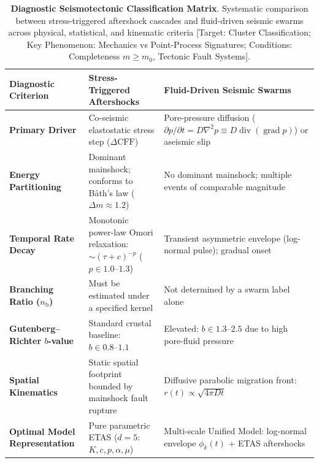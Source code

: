 \begin{table}[htbp]
  \centering
  \small
  \begin{threeparttable}
    \caption{\textbf{Diagnostic Seismotectonic Classification
      Matrix}. Systematic comparison between stress-triggered
      aftershock cascades and fluid-driven seismic swarms across
      physical, statistical, and kinematic criteria [Target: Cluster
        Classification; Key Phenomenon: Mechanics vs Point-Process
    Signatures; Conditions: Completeness $m \ge m_0$, Tectonic Fault Systems].}
    \label{tab:clustering_aftershock_vs_swarm}
    \begin{tabularx}{\textwidth}{l >{\raggedright\arraybackslash}X
      >{\raggedright\arraybackslash}X}
      \toprule
      \textbf{Diagnostic Criterion} & \textbf{Stress-Triggered
      Aftershocks} & \textbf{Fluid-Driven Seismic Swarms} \\
      \midrule
      \textbf{Primary Driver} & Co-seismic elastostatic stress step
      ($\Delta\mathrm{CFF}$) & Pore-pressure diffusion ($\partial p
        / \partial t = D \nabla^2 p \equiv D
      \operatorname{div}(\operatorname{grad} p)$) or aseismic slip \\
      \textbf{Energy Partitioning} & Dominant mainshock; conforms to
      B\r{a}th's law ($\Delta m \approx \num{1.2}$) & No dominant
      mainshock; multiple events of comparable magnitude \\
      \textbf{Temporal Rate Decay} & Monotonic power-law Omori
      relaxation: $\sim (\tau + c)^{-p}$ ($p \in
      \numrange{1.0}{1.3}$) & Transient asymmetric envelope (log-normal
      pulse); gradual onset \\
      \textbf{Branching Ratio ($n_{\mathrm{b}}$)} & Must be estimated
      under a specified kernel & Not determined by a swarm label alone \\
      \textbf{Gutenberg--Richter $b$-value} & Standard crustal
      baseline: $b \in \numrange{0.8}{1.1}$ & Elevated: $b \in
      \numrange{1.3}{2.5}$ due to high pore-fluid pressure \\
      \textbf{Spatial Kinematics} & Static spatial footprint bounded
      by mainshock fault rupture & Diffusive parabolic migration
      front: $r(t) \propto \sqrt{4\pi D t}$ \\
      \textbf{Optimal Model Representation} & Pure parametric
      \ac{ETAS} ($d = \num{5}$: $K, c, p, \alpha, \mu$) & Multi-scale
      Unified Model: log-normal envelope $\phi_k(t)$ + \ac{ETAS} aftershocks \\

\end{tabularx}
\end{threeparttable}
\end{table}

